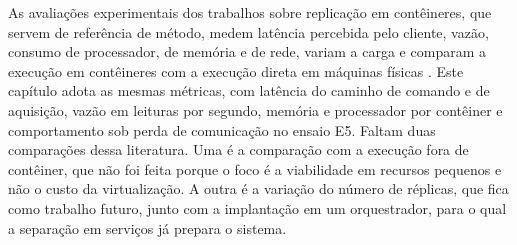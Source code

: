 \par As avaliações experimentais dos trabalhos sobre replicação em contêineres, que servem de referência de método, medem latência percebida pelo cliente, vazão, consumo de processador, de memória e de rede, variam a carga e comparam a execução em contêineres com a execução direta em máquinas físicas \cite{NETTO2019_RAFT_KUBERNETES,NETTO2016_STATE_MACHINE_REPLICATION_KUBERNETES,NETTO2017_COORDENACAO_CONTAINERS_KUBERNETES}. Este capítulo adota as mesmas métricas, com latência do caminho de comando e de aquisição, vazão em leituras por segundo, memória e processador por contêiner e comportamento sob perda de comunicação no ensaio E5. Faltam duas comparações dessa literatura. Uma é a comparação com a execução fora de contêiner, que não foi feita porque o foco é a viabilidade em recursos pequenos e não o custo da virtualização. A outra é a variação do número de réplicas, que fica como trabalho futuro, junto com a implantação em um orquestrador, para o qual a separação em serviços já prepara o sistema.
